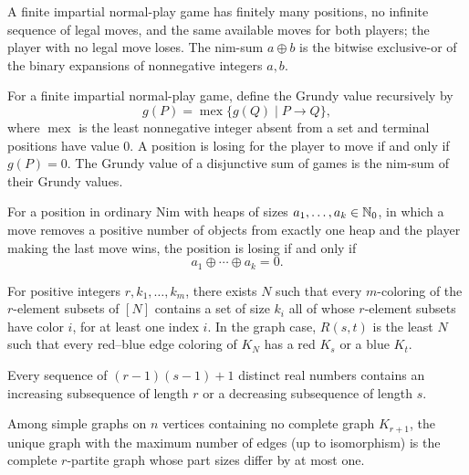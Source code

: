 \begin{definition}
A finite impartial normal-play game has finitely many positions, no infinite sequence of legal moves, and the same available moves for both players; the player with no legal move loses. The nim-sum $a\oplus b$ is the bitwise exclusive-or of the binary expansions of nonnegative integers $a,b$.
\end{definition}
\begin{theorem}
For a finite impartial normal-play game, define the Grundy value recursively by
\[
 g(P)=\operatorname{mex}\{g(Q)\mid P\to Q\},
\]
where $\operatorname{mex}$ is the least nonnegative integer absent from a set and terminal positions have value $0$. A position is losing for the player to move if and only if $g(P)=0$. The Grundy value of a disjunctive sum of games is the nim-sum of their Grundy values.
\end{theorem}
\begin{theorem}
For a position in ordinary Nim with heaps of sizes $a_1,\dots,a_k\in\mathbb{N}_0$, in which a move removes a positive number of objects from exactly one heap and the player making the last move wins, the position is losing if and only if
\[
 a_1\oplus\cdots\oplus a_k=0.
\]
\end{theorem}

\begin{theorem}
For positive integers $r, k_1, \dots, k_m$, there exists $N$ such that every $m$-coloring of the $r$-element subsets of $[N]$ contains a set of size $k_i$ all of whose $r$-element subsets have color $i$, for at least one index $i$. In the graph case, $R(s, t)$ is the least $N$ such that every red--blue edge coloring of $K_N$ has a red $K_s$ or a blue $K_t$.
\end{theorem}

\begin{theorem}
Every sequence of $(r-1)(s-1)+1$ distinct real numbers contains an increasing subsequence of length $r$ or a decreasing subsequence of length $s$.
\end{theorem}

\begin{theorem}
Among simple graphs on $n$ vertices containing no complete graph $K_{r+1}$, the unique graph with the maximum number of edges (up to isomorphism) is the complete $r$-partite graph whose part sizes differ by at most one.
\end{theorem}

